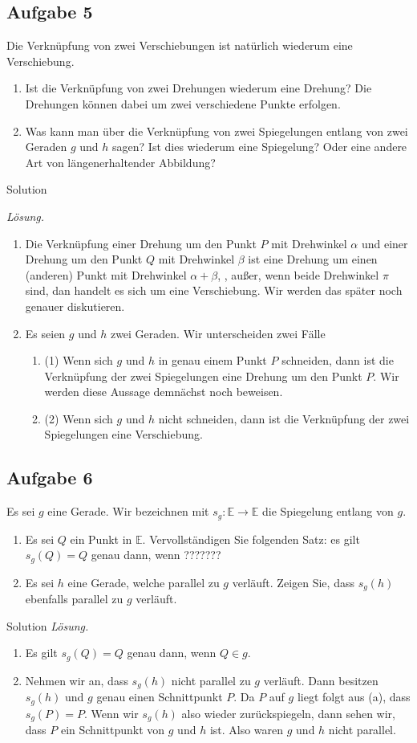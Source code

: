 \documentclass[12pt]{amsart}
\theoremstyle{plain}
\theoremstyle{remark}
\numberwithin{equation}{section}
\def\bnm{\begin{enumerate}}
\def\enm{\end{enumerate}}
\def\E{\mathbb{E}}
\def\bnal{\begin{enumerate}[label=(\alph*),leftmargin=1.2cm]}
\begin{document}
\subsection*{Aufgabe 5}
Die Verkn\"upfung von zwei Verschiebungen ist nat\"urlich wiederum eine Verschiebung.
\bnal
\item Ist die Verkn\"upfung von zwei Drehungen wiederum eine Drehung? Die Drehungen k\"onnen dabei um zwei verschiedene Punkte erfolgen.
\item Was kann man \"uber die Verkn\"upfung von zwei Spiegelungen entlang von zwei Geraden $g$ und $h$ sagen? 
Ist dies wiederum eine Spiegelung? Oder eine andere Art von l\"angenerhaltender Abbildung?
\enm

\begin{taggedblock}{Solution}

\noindent \emph{L\"osung.}\mbox{}
\bnal
\item Die Verkn\"upfung einer Drehung um den Punkt $P$ mit Drehwinkel $\alpha$ und einer Drehung um den Punkt $Q$ mit Drehwinkel $\beta$ ist  eine Drehung um einen (anderen) Punkt mit Drehwinkel $\alpha+\beta$, , au\ss er, wenn beide Drehwinkel $\pi$ sind, dan handelt es sich um eine Verschiebung. Wir werden das sp\"ater noch genauer diskutieren.
\item Es seien $g$ und $h$ zwei Geraden. Wir unterscheiden zwei F\"alle
\bnm
\item[(1)] Wenn sich $g$ und $h$ in genau einem Punkt $P$ schneiden, dann ist die Verkn\"upfung der zwei Spiegelungen eine Drehung um den Punkt $P$. 
Wir werden diese Aussage demn\"achst noch beweisen. 
\item[(2)] Wenn sich $g$ und $h$ nicht schneiden, dann ist die Verkn\"upfung der zwei Spiegelungen eine Verschiebung.
\enm
\enm

\end{taggedblock}

\subsection*{Aufgabe 6}
Es sei $g$ eine Gerade. Wir bezeichnen mit $s_g\colon \E\to \E$ die Spiegelung entlang von $g$. 
\bnal
\item Es sei $Q$ ein Punkt in $\E$. Vervollst\"andigen Sie folgenden Satz:  es gilt $s_g(Q)=Q$ genau dann, wenn ???????
\item Es sei $h$ eine Gerade, welche parallel zu $g$ verl\"auft. Zeigen Sie, dass $s_g(h)$ ebenfalls parallel zu $g$ verl\"auft.
\enm

\begin{taggedblock}{Solution}
\noindent \emph{L\"osung.}\mbox{}
\bnal
\item  Es gilt $s_g(Q)=Q$ genau dann, wenn $Q\in g$. 
\item  Nehmen wir an, dass $s_g(h)$ nicht  parallel zu $g$ verl\"auft. Dann besitzen $s_g(h)$ und $g$ genau einen Schnittpunkt $P$.
Da $P$ auf $g$ liegt folgt aus (a), dass $s_g(P)=P$. Wenn wir $s_g(h)$ also wieder zur\"uckspiegeln, dann sehen wir, dass $P$ ein Schnittpunkt von $g$ und $h$ ist. Also waren $g$ und $h$ nicht parallel.
\enm
\end{taggedblock}
\end{document}
